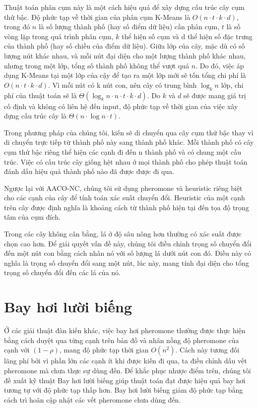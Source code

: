 Thuật toán phân cụm này là một cách hiệu quả để xây dựng cấu trúc cây cụm thứ bậc. Độ phức tạp về thời gian của phân cụm K-Means là $O(n \cdot t \cdot k \cdot d)$, trong đó $n$ là số lượng thành phố (hay số điểm dữ liệu) cần phân cụm, $t$ là số vòng lặp trong quá trình phân cụm, $k$ thể hiện số cụm và d thể hiện số đặc trưng của thành phố (hay số chiều của điểm dữ liệu). Giữa lớp của cây, mặc dù có số lượng nút khác nhau, và mỗi nút đại diện cho một lượng thành phố khác nhau, nhưng trong một lớp, tổng số thành phố không thể vượt quá $n$. Do đó, việc áp dụng K-Means tại một lớp của cậy để tạo ra một lớp mới sẽ tốn tổng chi phí là $O(n \cdot t \cdot k \cdot d)$. Vì mỗi nút có k nút con, nên cây có trung bình $\log_k n$ lớp, chi phí của thuật toán sẽ là $\Theta(\log_k n \cdot n \cdot t \cdot k \cdot d)$. Do $k$ và $d$ sẽ được mang giá trị cố định và không có liên hệ đến input, độ phức tạp về thời gian của việc xây dựng cấu trúc cây là $\Theta(n \cdot \log n \cdot t)$.

Trong phương pháp của chúng tôi, kiến sẽ di chuyển qua cây cụm thứ bậc thay vì di chuyển trực tiếp từ thành phố này sang thành phố khác. Mỗi thành phố có cây cụm thứ bậc riêng thể hiện các cạnh đi đến n thành phố và có chung một cấu trúc. Việc có cấu trúc cây giống hệt nhau ở mọi thành phố cho phép thuật toán đánh dấu hiệu quả thành phố nào đã được được đi qua.

Ngược lại với AACO-NC, chúng tôi sử dụng pheromone và heuristic riêng biệt cho các cạnh của cây để tính toán xác suất chuyển đổi. Heuristic của một cạnh trên cây được định nghĩa là khoảng cách từ thành phố hiện tại đến tọa độ trọng tâm của cụm đích.

Trong các cây không cân bằng, lá ở độ sâu nông hơn thường có xác suất được chọn cao hơn. Để giải quyết vấn đề này, chúng tôi điều chỉnh trọng số chuyển đổi đến một nút con bằng cách nhân nó với số lượng lá dưới nút con đó. Điều này có nghĩa là trọng số chuyển đổi sang một nút, lúc này, mang tính đại diện cho tổng trọng số chuyển đổi đến các lá của nó.

\section{Bay hơi lười biếng}\label{section:LazyEvaporation}

Ở các giải thuật đàn kiến khác, việc bay hơi pheromone thường được thực hiện bằng cách duyệt qua từng cạnh trên bản đồ và nhân nồng độ pheromone của cạnh với $(1-\rho)$, mang độ phức tạp thời gian $O(n^2)$. Cách này tương đối lãng phí bởi vì phần lớn các cạnh ít khi được kiến đi qua, ta điều chỉnh dấu vết pheromone mà chưa thực sự dùng đến. Để khắc phục nhược điểm trên, chúng tôi đề xuất kỹ thuật Bay hơi lười biếng giúp thuật toán đạt được hiệu quả bay hơi tương tự với độ phức tạp thấp hơn. Bay hơi lười biếng giảm độ phức tạp bằng cách trì hoãn cập nhật các vết pheromone chưa dùng đến.

